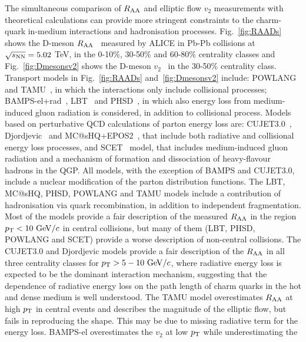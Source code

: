 The simultaneous comparison of $R_{\rm AA}$ and elliptic flow $v_2$ measurements 
with theoretical calculations can provide more stringent constraints to the 
charm-quark in-medium interactions and hadronisation processes.
Fig.~\ref{fig:RAADs} shows the D-meson $R_{\rm AA}$~\cite{ALICE-PUBLIC-2017-003}  
measured by ALICE in Pb-Pb collisions at $\sqrt{s_{\rm NN}} = 5.02$ TeV, in the 0-10\%, 30-50\% and 60-80\% 
centrality classes and Fig.~\ref{fig:Dmesonsv2} shows the D-meson $v_2$~\cite{Acharya:2017qps} in the 30-50\% 
centrality class.
Transport models in Fig.~\ref{fig:RAADs} and~\ref{fig:Dmesonsv2} include: 
POWLANG~\cite{Beraudo:2014boa} and TAMU~\cite{He:2014cla}, 
in which the interactions only include collisional processes; 
BAMPS-el+rad~\cite{Uphoff:2014hza}, LBT~\cite{Cao:2017hhk} and 
PHSD~\cite{Song:2015ykw}, in which also energy loss from medium-induced gluon radiation
is considered, in addition to collisional process.
Models based on perturbative QCD calculations of parton energy loss 
are: CUJET3.0~\cite{Xu:2015bbz}, Djordjevic~\cite{Djordjevic:2015hra} 
and MC@sHQ+EPOS2~\cite{Nahrgang:2013xaa}, that include both radiative 
and collisional energy loss processes, and SCET~\cite{Kang:2016ofv} model, that includes 
medium-induced gluon radiation and a mechanism of formation and dissociation of 
heavy-flavour hadrons in the QGP. All models, with the exception of BAMPS and CUJET3.0, 
include a nuclear modification of the parton distribution functions.
The LBT, MC@sHQ, PHSD, POWLANG and TAMU
models include a contribution of hadronisation via quark recombination, 
in addition to independent fragmentation. 
Most of the models provide a fair description of the measured $R_{\rm AA}$ in the region 
$p_{\rm T}<10~\mathrm{GeV}/c$ in central collisions, 
but many of them (LBT, PHSD, POWLANG and SCET) provide a worse 
description of non-central collisions.
The CUJET3.0 and Djordjevic models provide a fair description of the $R_{\rm AA}$ in all three 
centrality classes for $p_{\rm T} > 5-10~\mathrm{GeV}/c$, where radiative energy loss 
is expected to be the dominant interaction mechanism, suggesting that 
the dependence of radiative energy loss on the path length of charm 
quarks in the hot and dense medium is well understood. 
The TAMU model overestimates $R_{\rm AA}$ at high $p_{\rm T}$ in central events and describes 
the magnitude of the elliptic flow, but fails in reproducing the shape. This
may be due to missing radiative term for the energy loss. 
BAMPS-el overestimates the $v_2$ at low $p_{\rm T}$ while underestimating the 

